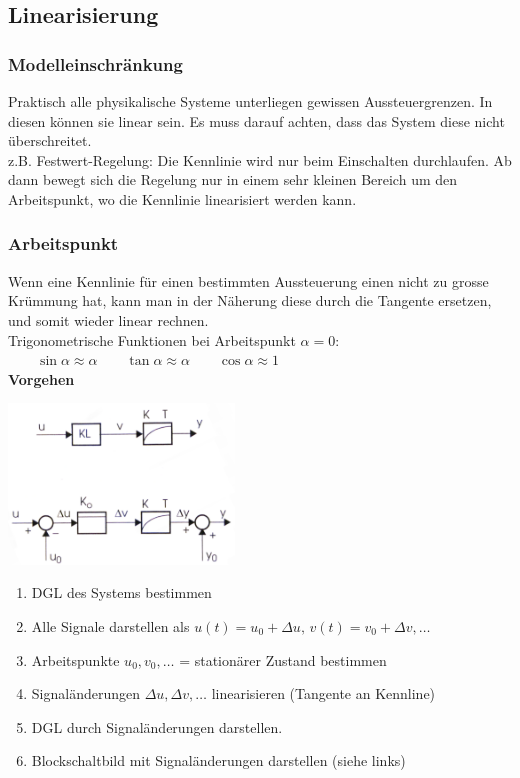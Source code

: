 	\subsection{Linearisierung}
		\subsubsection{Modelleinschränkung }
			Praktisch alle physikalische Systeme unterliegen gewissen Aussteuergrenzen.
			In diesen können sie linear sein. Es muss darauf achten, dass  das System
			diese nicht überschreitet. \\
			z.B. Festwert-Regelung: Die Kennlinie wird nur beim Einschalten durchlaufen.
			Ab dann bewegt sich die Regelung nur in einem sehr kleinen Bereich um den
			Arbeitspunkt, wo die Kennlinie linearisiert werden kann. \\
			
		\subsubsection{Arbeitspunkt }
			Wenn eine Kennlinie für einen bestimmten Aussteuerung einen nicht zu grosse
			Krümmung hat, kann man in der Näherung diese durch die Tangente ersetzen, und
			somit wieder linear rechnen. \\
			Trigonometrische Funktionen bei Arbeitspunkt $\alpha = 0$: $\qquad \sin \alpha \approx
			\alpha \qquad \tan \alpha \approx \alpha \qquad \cos \alpha \approx 1$ \\
			\textbf{Vorgehen} \\
			\begin{minipage}[c]{6cm}
				\includegraphics[width=6cm]{bilder/LinArbeitspunkt}
			\end{minipage}
			\begin{minipage}[c]{12cm}
				\begin{enumerate}
					\item DGL des Systems bestimmen
					\item Alle Signale darstellen als $u(t)=u_0+\Delta u,\,v(t)=v_0+\Delta v,\dots$
					\item Arbeitspunkte $u_0,v_0,\dots$ = stationärer Zustand bestimmen
					\item Signaländerungen $\Delta u, \Delta v, \dots$ linearisieren
							(Tangente an Kennline)
					\item DGL durch Signaländerungen darstellen.
					\item Blockschaltbild mit Signaländerungen darstellen (siehe links)
				\end{enumerate}
			\end{minipage}
			
